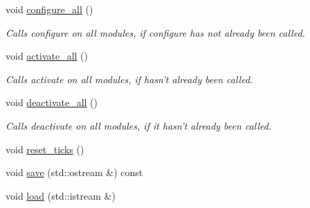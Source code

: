 \begin{DoxyCompactItemize}
void \hyperlink{structecto_1_1plasm_a55d56445bd1d09b9422390fb49e81bec}{configure\-\_\-all} ()
\begin{DoxyCompactList}\small\item\em Calls configure on all modules, if configure has not already been called. \end{DoxyCompactList}\item 
void \hyperlink{structecto_1_1plasm_a4419135c6c8dd8bb0cc7f4807a025df2}{activate\-\_\-all} ()
\begin{DoxyCompactList}\small\item\em Calls activate on all modules, if hasn't already been called. \end{DoxyCompactList}\item 
void \hyperlink{structecto_1_1plasm_a6c10f2812f731c3787e5e22bdd80e9bc}{deactivate\-\_\-all} ()
\begin{DoxyCompactList}\small\item\em Calls deactivate on all modules, if it hasn't already been called. \end{DoxyCompactList}\item 
void \hyperlink{structecto_1_1plasm_a992f656fa931efc20d2cf1a97c963cec}{reset\-\_\-ticks} ()
\item 
void \hyperlink{structecto_1_1plasm_ab0fd6bec2e5d8943363fe5aa36c1d676}{save} (std\-::ostream \&) const 
\item 
void \hyperlink{structecto_1_1plasm_a854400c2f46f995731e058c72a547185}{load} (std\-::istream \&)
\end{DoxyCompactItemize}
